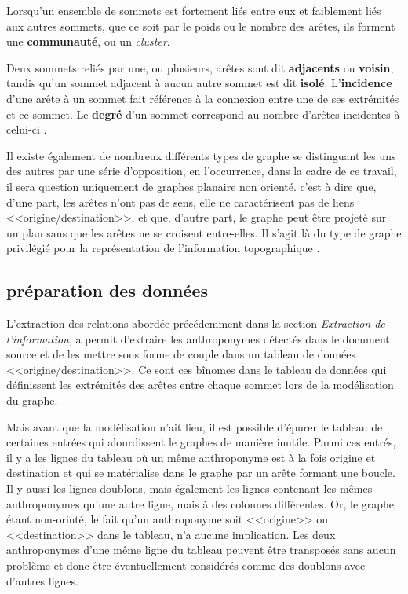 Lorsqu'un ensemble de sommets est fortement liés entre eux et faiblement liés aux autres sommets, que ce soit par le  poids ou le nombre  des arêtes, ils forment une \textbf{communauté}, ou un \textit{cluster}.

Deux sommets reliés par une, ou plusieurs, arêtes sont dit \textbf{adjacents} ou \textbf{voisin}, tandis qu'un sommet adjacent à aucun autre sommet est dit \textbf{isolé}. L'\textbf{incidence} d'une arête à un sommet fait référence à la connexion entre une de ses extrémités et ce sommet. Le \textbf{degré} d'un sommet correspond au nombre d'arêtes incidentes à celui-ci \parencite{beauguitte_graphes_2010,solnon_theorie_nodate}.

Il existe également de nombreux différents types de graphe se distinguant les uns des autres par une série d'opposition, en l'occurrence, dans la cadre de ce travail, il sera question uniquement de graphes planaire non orienté. c'est à dire que, d'une part, les arêtes n'ont pas de sens, elle ne caractérisent pas de liens <<origine/destination>>, et que, d'autre part, le graphe peut être projeté sur un plan sans que les arêtes ne se croisent entre-elles. Il s'agit là du type de graphe privilégié pour la représentation de l'information topographique \parencite{beauguitte_graphes_2010}.

\subsection{préparation des données}
L'extraction des relations abordée précédemment dans la section \textit{Extraction de l'information}, a permit d'extraire les anthroponymes détectés dans le document source et de les mettre sous forme de couple dans un tableau de données  <<origine/destination>>.
Ce sont ces bînomes dans le tableau de données qui définissent les extrémités des arêtes entre chaque sommet lors de la modélisation du graphe.

Mais avant que la modélisation n'ait lieu, il est possible d'épurer le tableau de certaines entrées qui alourdissent le graphes de manière inutile. Parmi ces entrés, il y a les lignes du tableau où un même anthroponyme est à la fois origine et destination et qui se matérialise dans le graphe par un arête formant une boucle. Il y aussi les lignes doublons, mais également les lignes contenant les mêmes anthroponymes qu'une autre ligne, mais à des colonnes différentes. Or, le graphe étant non-orinté, le fait qu'un anthroponyme soit <<origine>> ou <<destination>> dans le tableau, n'a aucune implication. Les deux anthroponymes d'une même ligne du tableau peuvent être transposés sans aucun problème et donc être éventuellement considérés comme des doublons avec d'autres lignes. 


